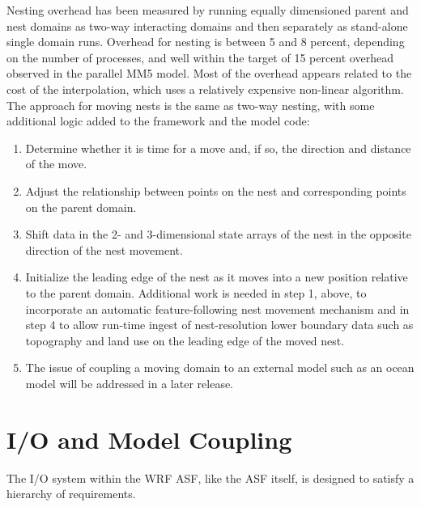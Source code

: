 Nesting overhead has been measured by running equally dimensioned parent and 
nest domains as two-way interacting domains and then separately as stand-alone 
single domain runs. Overhead for nesting is between 5 and 8 percent, depending on 
the number of processes, and well within the target of 15 percent overhead observed 
in the parallel MM5 model. Most of the overhead appears related to the cost of the 
interpolation, which uses a relatively expensive non-linear algorithm.
The approach for moving nests is the same as two-way nesting, with some additional 
logic added to the framework and the model code:

\begin{enumerate}\setlength{\parskip}{-4pt}
  \item Determine whether it is time for a move and, if so, the direction and distance of the move. 

  \item Adjust the relationship between points on the nest and corresponding points on the parent domain.

  \item Shift data in the 2- and 3-dimensional state arrays of the nest in the opposite direction of the nest movement.

  \item Initialize the leading edge of the nest as it moves into a new position relative to the parent domain. Additional work is needed in step 1, above, to incorporate an automatic feature-following 
nest movement mechanism and in step 4 to allow run-time ingest of nest-resolution lower 
boundary data such as topography and land use on the leading edge of the moved nest. 

  \item The issue of coupling a moving domain to an external model such as an ocean model will be addressed in a later release.
\end{enumerate}

\section{I/O and Model Coupling}

The I/O system within the WRF ASF, like the ASF itself, is designed to
satisfy a hierarchy of requirements. 

